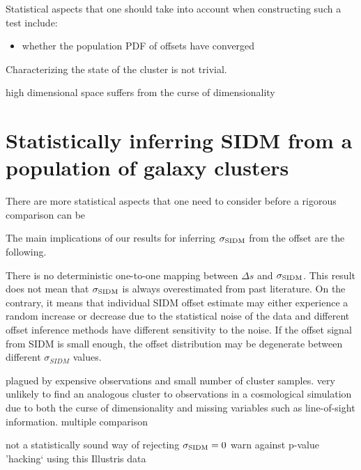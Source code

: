  
% 
Statistical aspects that one should take into account when constructing such a
test include: 
\begin{itemize}
\item whether the population PDF of offsets have converged  
\end{itemize}
 
Characterizing the state of the cluster is not trivial.

high dimensional space suffers from the curse of dimensionality 


% 

\section{Statistically inferring SIDM from a population of galaxy clusters} 

There are more statistical aspects that one need to consider before a rigorous
comparison can be 


The main implications of our results for inferring $\sigma_{\rm SIDM}$ from the
offset are the following.

There is no deterministic one-to-one mapping between $\Delta s$ and 
$\sigma_{\rm SIDM}$.  
This result does not mean that $\sigma_{\rm SIDM}$ is always overestimated from
past literature. 
On the contrary, it means that individual SIDM offset estimate may either
experience a random increase or decrease due to the statistical noise of 
 the data and different offset inference methods have different sensitivity to 
 the noise.
If the offset signal from SIDM is small enough, the offset distribution may be
degenerate between different $\sigma_{SIDM}$ values.


plagued by expensive observations and small number of cluster samples.
very unlikely to find an analogous cluster to observations in a cosmological simulation 
due to both the curse of dimensionality and missing variables such as
line-of-sight information.
multiple comparison 

not a statistically sound way of rejecting $\sigma_{\rm SIDM} = 0$
warn against p-value 'hacking` using this Illustris data


